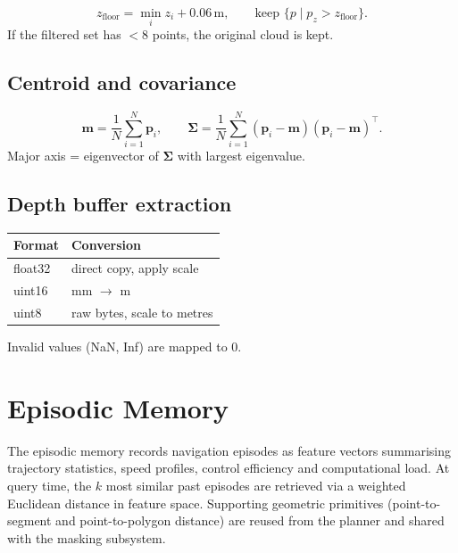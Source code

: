 \documentclass[a4paper, 11pt]{article}
\newcommand{\vect}[1]{\bm{#1}}
\newcommand{\mat}[1]{\bm{#1}}
\begin{document}
\begin{equation}
  z_{\text{floor}} = \min_i z_i + 0.06\,\text{m},
  \qquad
  \text{keep } \{p \mid p_z > z_{\text{floor}}\}.
\end{equation}
If the filtered set has $< 8$ points, the original cloud is kept.

\subsection{Centroid and covariance}

\begin{equation}
  \vect{m} = \frac{1}{N}\sum_{i=1}^N \vect{p}_i,
  \qquad
  \mat{\Sigma}
  = \frac{1}{N}\sum_{i=1}^N
    (\vect{p}_i - \vect{m})(\vect{p}_i - \vect{m})^\top.
\end{equation}
Major axis = eigenvector of $\mat{\Sigma}$ with largest eigenvalue.

\subsection{Depth buffer extraction}

\begin{center}
\begin{tabular}{ll}
  \toprule
  Format & Conversion \\
  \midrule
  float32 & direct copy, apply scale \\
  uint16  & mm $\to$ m \\
  uint8   & raw bytes, scale to metres \\
  \bottomrule
\end{tabular}
\end{center}
Invalid values (NaN, Inf) are mapped to $0$.

\section{Episodic Memory}\label{sec:episodic}

The episodic memory records navigation episodes as feature vectors
summarising trajectory statistics, speed profiles, control efficiency
and computational load.  At query time, the $k$ most similar past
episodes are retrieved via a weighted Euclidean distance in feature
space.  Supporting geometric primitives (point-to-segment and
point-to-polygon distance) are reused from the planner and shared with
the masking subsystem.
\end{document}
